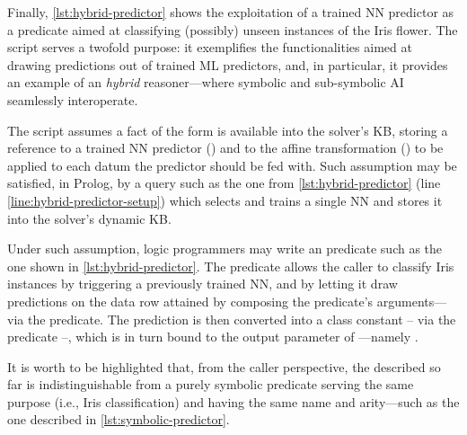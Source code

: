 \documentclass[runningheads]{llncs}
\begin{document}
\prologimport[
    float,
    label={lst:hybrid-predictor},
    caption={Exploitation of the NN classifier trained in \cref{lst:training} to create an hybrid predicate} %
]{listings/hybrid-predictor.pl}

Finally, \cref{lst:hybrid-predictor} shows the exploitation of a trained NN predictor as a predicate aimed at classifying (possibly) unseen instances of the Iris flower.
%
The script serves a twofold purpose: it exemplifies the \mllib{} functionalities aimed at drawing predictions out of trained ML predictors, and, in particular, it provides an example of an \emph{hybrid} reasoner---where symbolic and sub-symbolic AI seamlessly interoperate.

The script assumes a fact of the form  is available into the solver's KB, storing a reference to a trained NN predictor () and to the affine transformation () to be applied to each datum the predictor should be fed with.
%
Such assumption may be satisfied, in Prolog, by a query such as the one from \cref{lst:hybrid-predictor} (line \ref{line:hybrid-predictor-setup}) which selects and trains a single NN and stores it into the solver's dynamic KB.

Under such assumption, logic programmers may write an  predicate such as the one shown in \cref{lst:hybrid-predictor}.
%
The predicate allows the caller to classify Iris instances by triggering a previously trained NN, and by letting it draw predictions on the data row attained by composing the predicate's arguments---via the  predicate.
%
The prediction is then converted into a class constant -- via the  predicate --, which is in turn bound to the output parameter of ---namely .

It is worth to be highlighted that, from the caller perspective, the  described so far is indistinguishable from a purely symbolic predicate serving the same purpose (i.e., Iris classification) and having the same name and arity---such as the one described in \cref{lst:symbolic-predictor}.


\end{document}
